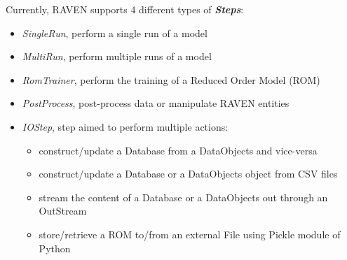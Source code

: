 Currently, RAVEN supports 4 different types of \textit{\textbf{Steps}}:
\begin{itemize}
  \item \textit{SingleRun}, perform a single run of a model
  \item \textit{MultiRun}, perform multiple runs of a model
  \item \textit{RomTrainer}, perform the training of a Reduced Order Model (ROM)
  \item \textit{PostProcess}, post-process data or manipulate RAVEN entities
  \item \textit{IOStep}, step aimed to perform multiple actions:
  \begin{itemize}
    \item construct/update a Database from a DataObjects and vice-versa
    \item construct/update a Database or a DataObjects object from CSV files 
    \item stream the content of a Database or a DataObjects out through an OutStream 
    \item store/retrieve a ROM to/from an external File using Pickle module of Python
  \end{itemize}
\end{itemize}

